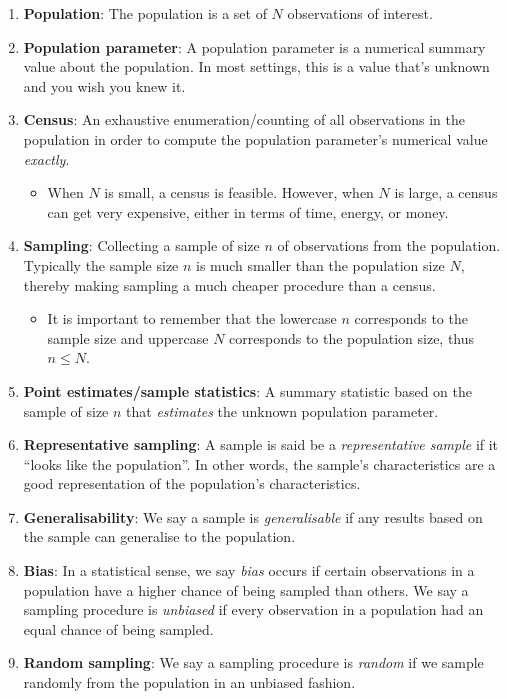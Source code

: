 \documentclass[
  letterpaper,
  DIV=11,
  numbers=noendperiod]{scrartcl}
\providecommand{\tightlist}{%
  \setlength{\itemsep}{0pt}\setlength{\parskip}{0pt}}\usepackage{longtable,booktabs,array}
\begin{document}
\begin{enumerate}
\def\labelenumi{\arabic{enumi}.}
\item
  \textbf{Population}: The population is a set of \(N\) observations of
  interest.
\item
  \textbf{Population parameter}: A population parameter is a numerical
  summary value about the population. In most settings, this is a value
  that's unknown and you wish you knew it.
\item
  \textbf{Census}: An exhaustive enumeration/counting of all
  observations in the population in order to compute the population
  parameter's numerical value \emph{exactly}.

  \begin{itemize}
  \tightlist
  \item
    When \(N\) is small, a census is feasible. However, when \(N\) is
    large, a census can get very expensive, either in terms of time,
    energy, or money.
  \end{itemize}
\item
  \textbf{Sampling}: Collecting a sample of size \(n\) of observations
  from the population. Typically the sample size \(n\) is much smaller
  than the population size \(N\), thereby making sampling a much cheaper
  procedure than a census.

  \begin{itemize}
  \tightlist
  \item
    It is important to remember that the lowercase \(n\) corresponds to
    the sample size and uppercase \(N\) corresponds to the population
    size, thus \(n \leq N\).
  \end{itemize}
\item
  \textbf{Point estimates/sample statistics}: A summary statistic based
  on the sample of size \(n\) that \emph{estimates} the unknown
  population parameter.
\item
  \textbf{Representative sampling}: A sample is said be a
  \emph{representative sample} if it ``looks like the population''. In
  other words, the sample's characteristics are a good representation of
  the population's characteristics.
\item
  \textbf{Generalisability}: We say a sample is \emph{generalisable} if
  any results based on the sample can generalise to the population.
\item
  \textbf{Bias}: In a statistical sense, we say \emph{bias} occurs if
  certain observations in a population have a higher chance of being
  sampled than others. We say a sampling procedure is \emph{unbiased} if
  every observation in a population had an equal chance of being
  sampled.
\item
  \textbf{Random sampling}: We say a sampling procedure is \emph{random}
  if we sample randomly from the population in an unbiased fashion.
\end{enumerate}
\end{document}
